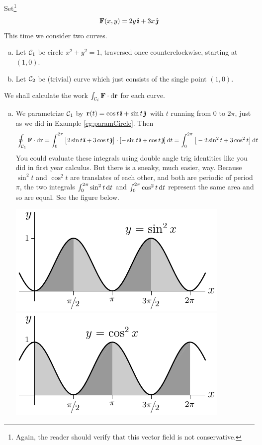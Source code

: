 \begin{eg}\label{eg:workIntegalB}
Set\footnote{Again, the reader should verify that this vector field is not conservative.} 
\begin{equation*}
\mathbf{F}(x,y) = 2y\,\hat{\pmb{\imath}} + 3x\,\hat{\pmb{\jmath}}
\end{equation*}
This time we consider two curves.
\begin{enumerate}[(a)]
\item 
Let $\mathcal{C}_1$ be circle $x^2+y^2=1$, traversed once counterclockwise, starting
at $(1,0)$.
\item 
Let $\mathcal{C}_2$ be (trivial) curve which just consists of the single point $(1,0)$.
\end{enumerate}
We shall calculate the work $\int_{\mathcal{C}_i}\mathbf{F}\cdot\mathrm{d}\mathbf{r}$ for each 
curve.
\begin{enumerate}[(a)]
\item 
We parametrize $\mathcal{C}_1$ by $\mathbf{r}(t) = \cos t\,\hat{\pmb{\imath}}+\sin t\,\hat{\pmb{\jmath}}$ with $t$ 
running from $0$ to $2\pi$, just as we did in Example \ref{eg:paramCircle}.
Then 
\begin{align*}
\oint_{\mathcal{C}_1}\mathbf{F}\cdot\mathrm{d}\mathbf{r}
&=\int_{0}^{2\pi}\big[2\sin t\,\hat{\pmb{\imath}} + 3\cos t\,\hat{\pmb{\jmath}}\big]
           \cdot[-\sin t\,\hat{\pmb{\imath}} + \cos t\,\hat{\pmb{\jmath}}]\,\mathrm{d}t
=\int_{0}^{2\pi}\big[-2\sin^2 t+3\cos^2 t\big]\,\mathrm{d}t
\end{align*}
You could evaluate these integrals using double angle trig identities
like you did in first year calculus. But there is a sneaky, much easier, way.
Because $\sin^2 t$ and $\cos^2 t$ are translates of each other, and both are
periodic of period $\pi$, the two integrals 
$\int_0^{2\pi}\sin ^2 t\,\mathrm{d}t$ and $\int_0^{2\pi}\cos ^2 t\,\mathrm{d}t$
represent the same area and so are equal. See the figure below. 
\begin{mfig}
\begin{center}
    \includegraphics{sin2Graph.pdf}\qquad
    \includegraphics{cos2Graph.pdf}

\end{center}
\end{mfig}
\end{enumerate}
\end{eg}
